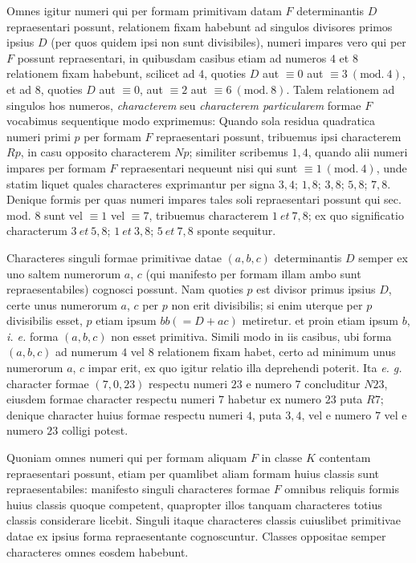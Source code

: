 Omnes igitur numeri qui per formam primitivam datam $F$ determinantis $D$ repraesentari possunt, relationem fixam habebunt ad singulos divisores primos ipsius $D$ (per quos quidem ipsi non sunt divisibiles), numeri impares vero qui per $F$ possunt repraesentari, in quibusdam casibus etiam ad numeros $4$ et $8$ relationem fixam habebunt, scilicet ad $4$, quoties $D$ aut $\equiv0$ aut $\equiv3\ (\mathrm{mod.}\ 4)$, et ad $8$, quoties $D$ aut $\equiv0$, aut $\equiv2$ aut $\equiv6\ (\mathrm{mod.}\ 8)$. Talem relationem ad singulos hos numeros, \textit{characterem} seu \textit{characterem particularem} formae $F$ vocabimus sequentique modo exprimemus: Quando sola residua quadratica numeri primi $p$ per formam $F$ repraesentari possunt, tribuemus ipsi characterem $Rp$, in casu opposito characterem $Np$; similiter scribemus $1,4$, quando alii numeri impares per formam $F$ repraesentari nequeunt nisi qui sunt $\equiv1\ (\mathrm{mod.}\ 4)$, unde statim liquet quales characteres exprimantur per signa $3,4$; $1,8$; $3,8$; $5,8$; $7,8$. Denique formis per quas numeri impares tales soli repraesentari possunt qui sec.
mod. $8$ sunt vel $\equiv1$ vel $\equiv7$, tribuemus characterem $1\ \mathit{et}\ 7,8$; ex quo significatio characterum $3\ \mathit{et}\ 5,8$; $1\ \mathit{et}\ 3,8$; $5\ \mathit{et}\ 7,8$ sponte sequitur.

Characteres singuli formae primitivae datae $(a,b,c)$ determinantis $D$ semper ex uno saltem numerorum $a$, $c$ (qui manifesto per formam illam ambo sunt repraesentabiles) cognosci possunt. Nam quoties $p$ est divisor primus ipsius $D$, certe unus numerorum $a$, $c$ per $p$ non erit divisibilis; si enim uterque per $p$ divisibilis esset, $p$ etiam ipsum $bb(=D+ac)$ metiretur. et proin etiam ipsum $b$, \textit{i. e.} forma $(a,b,c)$ non esset primitiva. Simili modo in iis casibus, ubi forma $(a,b,c)$ ad numerum $4$ vel $8$ relationem fixam habet, certo ad minimum unus numerorum $a$, $c$ impar erit, ex quo igitur relatio illa deprehendi poterit. Ita \textit{e. g.} character formae $(7,0,23)$ respectu numeri $23$ e numero $7$ concluditur $N23$, eiusdem formae character respectu numeri $7$ habetur ex numero $23$ puta $R7$; denique character huius formae respectu numeri $4$, puta $3,4$, vel e numero $7$ vel e numero $23$ colligi potest.

Quoniam omnes numeri qui per formam aliquam $F$ in classe $K$ contentam repraesentari possunt, etiam per quamlibet aliam formam huius classis sunt repraesentabiles: manifesto singuli characteres formae $F$ omnibus reliquis formis huius classis quoque competent, quapropter illos tanquam characteres totius classis considerare licebit. Singuli itaque characteres classis cuiuslibet primitivae datae ex ipsius forma repraesentante cognoscuntur. Classes oppositae semper characteres omnes eosdem habebunt.

